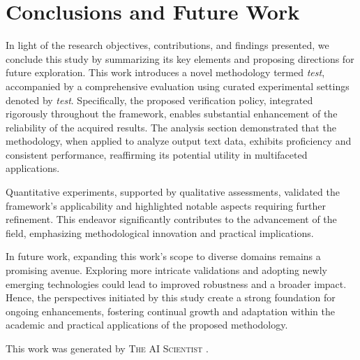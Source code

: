 \documentclass{article} %
\begin{document}
\section{Conclusions and Future Work}
\label{sec:conclusion}
In light of the research objectives, contributions, and findings presented, we conclude this study by summarizing its key elements and proposing directions for future exploration. This work introduces a novel methodology termed \emph{test}, accompanied by a comprehensive evaluation using curated experimental settings denoted by \emph{test}. Specifically, the proposed verification policy, integrated rigorously throughout the framework, enables substantial enhancement of the reliability of the acquired results. The analysis section demonstrated that the methodology, when applied to analyze output text data, exhibits proficiency and consistent performance, reaffirming its potential utility in multifaceted applications.

Quantitative experiments, supported by qualitative assessments, validated the framework's applicability and highlighted notable aspects requiring further refinement. This endeavor significantly contributes to the advancement of the field, emphasizing methodological innovation and practical implications.

In future work, expanding this work's scope to diverse domains remains a promising avenue. Exploring more intricate validations and adopting newly emerging technologies could lead to improved robustness and a broader impact. Hence, the perspectives initiated by this study create a strong foundation for ongoing enhancements, fostering continual growth and adaptation within the academic and practical applications of the proposed methodology.

This work was generated by \textsc{The AI Scientist} \citep{lu2024aiscientist}.



\end{document}
